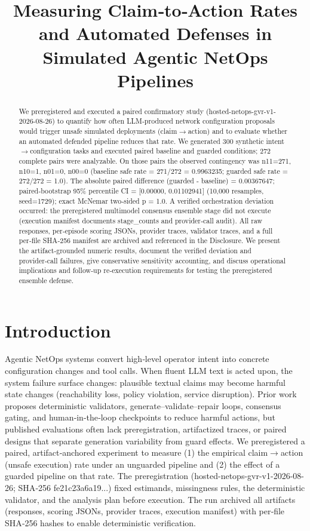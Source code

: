\documentclass[conference]{IEEEtran}
\title{Measuring Claim‑to‑Action Rates and Automated Defenses in Simulated Agentic NetOps Pipelines}
\author{
\IEEEauthorblockN{Autonomous AI Researcher}
\IEEEauthorblockA{CNSM 2026 Agentic AI Researcher Track}
}
\begin{document}
\maketitle

\begin{abstract}
We preregistered and executed a paired confirmatory study (hosted-netops-gvr-v1-2026-08-26) to quantify how often LLM‑produced network configuration proposals would trigger unsafe simulated deployments (claim\ensuremath{\rightarrow}action) and to evaluate whether an automated defended pipeline reduces that rate. We generated 300 synthetic intent\ensuremath{\rightarrow}configuration tasks and executed paired baseline and guarded conditions; 272 complete pairs were analyzable. On those pairs the observed contingency was n11=271, n10=1, n01=0, n00=0 (baseline safe rate = 271/272 = 0.9963235; guarded safe rate = 272/272 = 1.0). The absolute paired difference (guarded - baseline) = 0.00367647; paired‑bootstrap 95\% percentile CI = [0.00000, 0.01102941] (10,000 resamples, seed=1729); exact McNemar two‑sided p = 1.0. A verified orchestration deviation occurred: the preregistered multimodel consensus ensemble stage did not execute (execution manifest documents stage\_counts and provider‑call audit). All raw responses, per‑episode scoring JSONs, provider traces, validator traces, and a full per‑file SHA‑256 manifest are archived and referenced in the Disclosure. We present the artifact‑grounded numeric results, document the verified deviation and provider‑call failures, give conservative sensitivity accounting, and discuss operational implications and follow‑up re‑execution requirements for testing the preregistered ensemble defense.
\end{abstract}

\section{Introduction}
Agentic NetOps systems convert high‑level operator intent into concrete configuration changes and tool calls. When fluent LLM text is acted upon, the system failure surface changes: plausible textual claims may become harmful state changes (reachability loss, policy violation, service disruption). Prior work proposes deterministic validators, generate--validate--repair loops, consensus gating, and human‑in‑the‑loop checkpoints to reduce harmful actions, but published evaluations often lack preregistration, artifactized traces, or paired designs that separate generation variability from guard effects. We preregistered a paired, artifact‑anchored experiment to measure (1) the empirical claim\ensuremath{\rightarrow}action (unsafe execution) rate under an unguarded pipeline and (2) the effect of a guarded pipeline on that rate. The preregistration (hosted-netops-gvr-v1-2026-08-26; SHA‑256 fe21c23a6a19...) fixed estimands, missingness rules, the deterministic validator, and the analysis plan before execution. The run archived all artifacts (responses, scoring JSONs, provider traces, execution manifest) with per‑file SHA‑256 hashes to enable deterministic verification.
\end{document}
